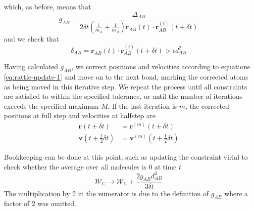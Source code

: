 which, as before, means that 
\begin{equation}
	g_{AB} = \frac{ \Delta_{AB} }{2 \delta t (\frac{1}{m_A} + \frac{1}{m_B}) \mathbf{r}_{AB}(t) \cdot \mathbf{r}^{(i)}_{AB}(t + \delta t)}
\end{equation}
and we check that
\begin{equation}
	\delta_{AB} = \mathbf{r}_{AB}(t) \cdot \mathbf{r}^{(i)}_{AB}(t + \delta t) > \epsilon d_{AB}^2
\end{equation}
\par Having calculated $g_{AB}$, we correct positions and velocities according to equations \ref{eq:rattle-update-1} and move on to the next bond, marking the corrected atoms as being moved in this iterative step. We repeat the process until all constraints are satisfied to within the specified tolerance, or until the number of iterations exceeds the specified maximum $M$. If the last iteration is $m$, the corrected positions at full step and velocities at halfstep are
\begin{equation*}
\begin{aligned}
	\mathbf{r}(t + \delta t) &= \mathbf{r}^{(m)}(t + \delta t) 		\\
	\mathbf{v}(t + \frac{1}{2} \delta t) &= \mathbf{v}^{(m)}(t + \frac{1}{2}\delta t)
\end{aligned}
\end{equation*}
\par Bookkeeping can be done at this point, such as updating the constraint virial to check whether the average over all molecules is $0$ at time $t$
\begin{equation*}
\mathcal{W}_C \rightarrow \mathcal{W}_C + \frac{2 g_{AB} d_{AB}^2}{3 \delta t }
\end{equation*}
The multiplication by 2 in the numerator is due to the definition of $g_{AB}$ where a factor of 2 was omitted.